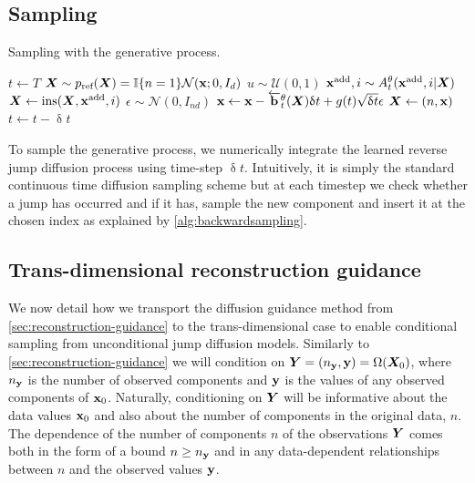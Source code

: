 \subsection{Sampling}

\begin{algorithm}[t]
\caption{Sampling with the generative process.}
\begin{algorithmic}[1] %
\State $t \leftarrow T$
\State ${\bm{X}} \sim p_{\textup{ref}}({\bm{X}}) = \mathbb{I}\{ n=1\} \mathcal{N}({\mathbf{x}}; 0, I_{d})$
    \State $u \sim \mathcal{U}(0, 1)$
        \State ${\mathbf{x}}^{\textup{add}}, i \sim A_{t}^\theta({\mathbf{x}}^{\textup{add}}, i | {\bm{X}})$
        \State ${\bm{X}} \leftarrow \text{ins}({\bm{X}}, {\mathbf{x}}^{\textup{add}}, i)$
    \EndIf
    \State $\epsilon \sim \mathcal{N}(0, I_{nd})$
    \State ${\mathbf{x}} \leftarrow {\mathbf{x}} - \overleftarrow{\mathbf{b}}_{t}^\theta({\bm{X}}) \updelta t + g(t) \sqrt{\updelta t} \epsilon$
    \State ${\bm{X}} \leftarrow (n, {\mathbf{x}})$
    \State $t \leftarrow t - \updelta t$
\EndWhile
\end{algorithmic}
\label{alg:backwardsampling}
\end{algorithm}

To sample the generative process, we numerically integrate the learned reverse jump diffusion process using time-step  $\updelta t$. Intuitively, it is simply the standard continuous time diffusion sampling scheme \cite{song2020score} but at each timestep we check whether a jump has occurred and if it has, sample the new component and insert it at the chosen index as explained by \cref{alg:backwardsampling}.

\subsection{Trans-dimensional reconstruction guidance} \label{sec:tddm-reconstruction-guidance}
We now detail how we transport the diffusion guidance method from \cref{sec:reconstruction-guidance} to the trans-dimensional case to enable conditional sampling from unconditional jump diffusion models. Similarly to \cref{sec:reconstruction-guidance} we will condition on ${\bm{Y}} = (n_{\mathbf{y}}, {\mathbf{y}}) = \Omega({\bm{X}}_0)$, where $n_{\mathbf{y}}$ is  the number of observed components and ${\mathbf{y}}$ is the values of any observed components of ${\mathbf{x}}_0$. Naturally, conditioning on ${\bm{Y}}$ will be informative about the data values ${\mathbf{x}}_0$ and also about the number of components in the original data, $n$. The dependence of the number of components $n$ of the observations ${\bm{Y}}$ comes both in the form of a bound $n \geq n_{\mathbf{y}}$ and in any data-dependent relationships between $n$ and the observed values ${\mathbf{y}}$.

